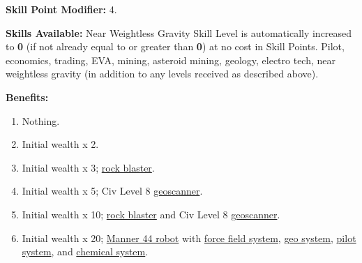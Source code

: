 \textbf{Skill Point Modifier:} 4.

\textbf{Skills Available:} Near Weightless Gravity Skill Level is
automatically increased to \textbf{0} (if not already equal to or
greater than \textbf{0}) at no cost in Skill Points. Pilot, economics,
trading, EVA, mining, asteroid mining, geology, electro tech, near
weightless gravity (in addition to any levels received as described
above).

\pagebreak[2]
\textbf{Benefits:}
\begin{enumerate}
\item Nothing.  
\item Initial wealth x 2.   
\item Initial wealth x 3; \hyperlink{tag:rock-blaster}{rock blaster}.  
\item Initial wealth x 5;  Civ Level 8 \hyperlink{tag:geoscanner}{geoscanner}.  
\item Initial wealth x 10; \hyperlink{tag:rock-blaster}{rock blaster} and Civ Level 8  \hyperlink{tag:geoscanner}{geoscanner}. 
\item Initial wealth x 20; \hyperlink{tag:bot-manner-44}{Manner 44 robot} with \hyperlink{tag:bot-force-field}{force field system},
  \hyperlink{tag:bot-geo}{geo system}, \hyperlink{tag:bot-pilot}{pilot system}, and \hyperlink{tag:bot-chemical}{chemical system}.
\end{enumerate}

\addtocounter{myprofs}{-1}
\label{item:myprofs}
